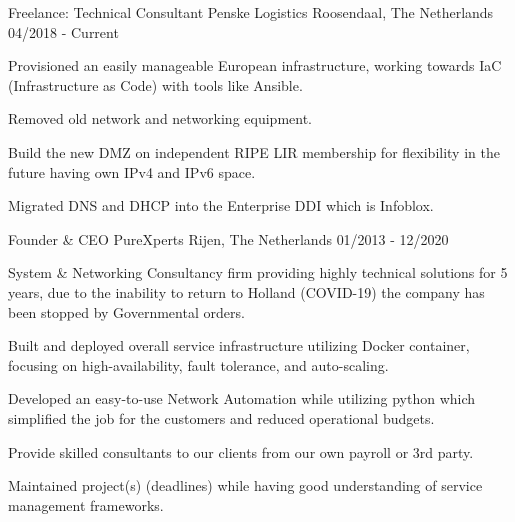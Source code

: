 

\begin{cventries}

\cventry
	{Freelance: Technical Consultant}  %
    {Penske Logistics} %
    {Roosendaal, The Netherlands} %
    {04/2018 - Current} %
    {
      \begin{cvitems} %
       \item {Provisioned an easily manageable European infrastructure, working towards IaC (Infrastructure as Code) with tools like Ansible.}
       \item {Removed old network and networking equipment.}
       \item {Build the new DMZ on independent RIPE LIR membership for flexibility in the future having own IPv4 and IPv6 space.}
       \item {Migrated DNS and DHCP into the Enterprise DDI which is Infoblox.}
       \end{cvitems}
	}
  \cventry
    {Founder \& CEO} %
    {PureXperts} %
    {Rijen, The Netherlands} %
    {01/2013 - 12/2020} %
    {
      \begin{cvitems} %
      \item {System \& Networking Consultancy firm providing highly technical solutions for 5 years, due to the inability to return to Holland (COVID-19) the company has been stopped by Governmental orders.}
        \item {Built and deployed overall service infrastructure utilizing Docker container, focusing on high-availability, fault tolerance, and auto-scaling.}
        \item {Developed an easy-to-use Network Automation while utilizing python which simplified the job for the customers and reduced operational budgets.}
	\item {Provide skilled consultants to our clients from our own payroll or 3rd party.}
	\item {Maintained project(s) (deadlines) while having good understanding of service management frameworks.}

\end{cvitems}}
\end{cventries}
